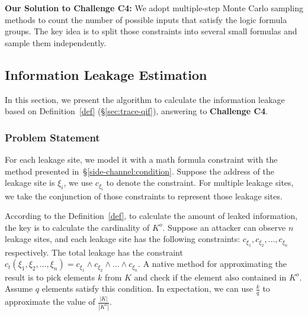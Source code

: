 \vspace*{6pt}
\textbf{Our Solution to Challenge C4:}
We adopt multiple-step Monte Carlo sampling methods to count the number of
possible inputs that satisfy the logic formula groups. The key idea is to split
those constraints into several small formulas and sample them independently.

\subsection{Information Leakage Estimation}

\newcommand{\addr}[1]{{l}_{#1}}
\renewcommand{\addr}[1]{{\gamma}_{#1}}
\renewcommand{\addr}[1]{{\zeta}_{#1}}
\renewcommand{\addr}[1]{{\xi}_{#1}}

In this section, we present the algorithm to calculate the information leakage
based on Definition~\ref{def} (\S\ref{sec:trace-qif}), answering to
\textbf{Challenge C4}.

\subsubsection{Problem Statement}
For each leakage site, we model it with a math formula constraint with the
method presented in~\S\ref{side-channel:condition}. Suppose the address of the
leakage site is $\addr{i}$, we use $c_{\addr{i}}$ to denote the constraint. For
multiple leakage sites, we take the conjunction of those constraints to
represent those leakage sites.

According to the Definition~\ref{def}, to calculate the amount of leaked
information, the key is to calculate 
the cardinality
of $K^o$. Suppose an attacker can observe $n$ leakage sites, and each leakage
site has the following constraints: $c_{\addr{1}}, c_{\addr{2}}, \ldots,
c_{\addr{n}}$ respectively. The total leakage has the constraint
$c_t({\addr{1}},{\addr{2}},\ldots,{\addr{n}}) = c_{\addr{1}} \land c_{\addr{2}}
\land \ldots \land c_{\addr{n}}$. 
A native method for
approximating the result is to pick elements $k$ from $K$ and check if the
element also contained in $K^o$. Assume $q$ elements satisfy this condition. In
expectation, we can use $\frac{k}{q}$ to approximate the value of
$\frac{|K|}{|K^o|}$.

